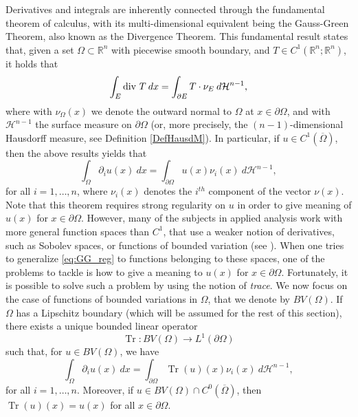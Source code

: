 \documentclass[artcle, 11pt, reqno]{amsart}
\numberwithin{equation}{section}
\newcommand{\R}{\mathbb{R}}
\newcommand{\Hd}{\mathcal{H}}
\newcommand{\pom}{{\partial \Omega}}
\newcommand{\dd}{\: d}
\DeclareMathOperator{\Tr}{Tr}
\theoremstyle{plain}
\theoremstyle{definition}
\theoremstyle{remark}
\begin{document}
	Derivatives and integrals are inherently connected through the fundamental theorem of calculus, with its multi-dimensional equivalent being the Gauss-Green Theorem, also known as the Divergence Theorem. This fundamental result states that, given a set $\Omega \subset \R^n$ with piecewise smooth boundary, and $T \in C^1(\R^n;\R^n)$, it holds that 
	\begin{equation} \label{eq:GGtheorem}
		\int_E \textnormal{div } T\dd x = \int_{\partial E} T \cdot \nu_E \dd\Hd^{n-1},
	\end{equation}
	where with $\nu_\Omega(x)$ we denote the outward normal to $\Omega$ at $x \in \partial \Omega$, and with $\Hd^{n-1}$ the surface measure on $\partial\Omega$ (or, more precisely, the $(n-1)$-dimensional Hausdorff measure, see Definition \ref{DefHausdM}).
	In particular, if $u\in C^1(\overline{\Omega})$, then the above results yields that
	\begin{equation}\label{eq:GG_reg}
		\int_\Omega \partial_i u(x)\dd x = \int_{\partial\Omega} u(x)\nu_i(x)\dd\Hd^{n-1},
	\end{equation}
	for all $i=1,\dots,n$, where $\nu_i(x)$ denotes the $i^{th}$ component of the vector $\nu(x)$.
	Note that this theorem requires strong regularity on $u$ in order to give meaning of $u(x)$ for $x\in\partial\Omega$. However, many of the subjects in applied analysis work with more general function spaces than $C^1$, that use a weaker notion of derivatives, such as Sobolev spaces, or functions of bounded variation (see \cite{leoni2017first}).
	When one tries to generalize \eqref{eq:GG_reg} to functions belonging to these spaces, one of the problems to tackle is how to give a meaning to $u(x)$ for $x\in\partial\Omega$.
	Fortunately, it is possible to solve such a problem by using the notion of \emph{trace}. We now focus on the case of functions of bounded variations in $\Omega$, that we denote by $BV(\Omega)$. If $\Omega$ has a Lipschitz boundary (which will be assumed for the rest of this section), there exists a unique bounded linear operator
	\[
	\Tr: BV(\Omega) \rightarrow L^1(\pom)
	\]
	such that, for $u \in BV(\Omega)$, we have  
	\[
	\int_\Omega \partial_i u(x)\dd x = \int_{\partial\Omega} \Tr(u)(x)\nu_i(x)\dd\Hd^{n-1},
	\]
	for all $i=1,\dots,n$. Moreover, if $u\in BV(\Omega)\cap C^0(\overline{\Omega})$, then $\Tr(u)(x)=u(x)$ for all $x\in\partial\Omega$.
	
\end{document}
